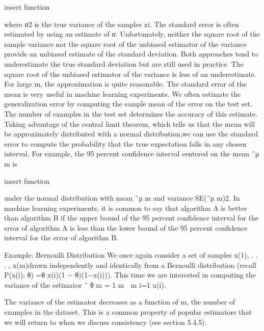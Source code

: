 \documentclass[11pt]{article}
\begin{document}
    insert function

where σ2 is the true variance of the samples xi.
The standard error is often estimated by using an estimate of σ.
Unfortunately, neither the square root of the sample variance nor the square root of the unbiased estimator of the variance provide an unbiased estimate of the standard deviation.
Both approaches tend to underestimate the true standard deviation but are still used in practice.
The square root of the unbiased estimator of the variance is less of an underestimate.
For large m, the approximation is quite reasonable.
The standard error of the mean is very useful in machine learning experiments.
We often estimate the generalization error by computing the sample mean of the error on the test set.
The number of examples in the test set determines the accuracy of this estimate.
Taking advantage of the central limit theorem, which tells us that the mean will be approximately distributed with a normal distribution,we can use the standard error to compute the probability that the true expectation falls in any chosen interval.
For example, the 95 percent conﬁdence interval centered on the mean ˆµ m is

    insert function

under the normal distribution with mean ˆµ m and variance SE(ˆµ m)2.
In machine learning experiments, it is common to say that algorithm A is better than algorithm B if the upper bound of the 95 percent conﬁdence interval for the error of algorithm A is less than the lower bound of the 95 percent conﬁdence interval for the error of algorithm B.

Example: Bernoulli Distribution
We once again consider a set of samples {x(1), . . . , x(m)}drawn independently and identically from a Bernoulli distribution
(recall P(x(i); θ) =θ x(i)(1 − θ)(1−x(i))).
This time we are interested in computing the variance of the estimator ˆ θ m = 1 m  m i=1 x(i).

The variance of the estimator decreases as a function of m, the number of examples in the dataset.
This is a common property of popular estimators that we will return to when we discuss consistency (see section 5.4.5).
\end{document}
